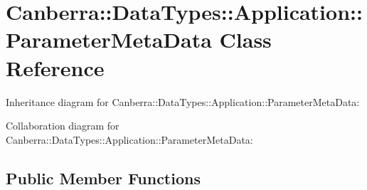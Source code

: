 \hypertarget{class_canberra_1_1_data_types_1_1_application_1_1_parameter_meta_data}{}\section{Canberra\+:\+:Data\+Types\+:\+:Application\+:\+:Parameter\+Meta\+Data Class Reference}
\label{class_canberra_1_1_data_types_1_1_application_1_1_parameter_meta_data}


Inheritance diagram for Canberra\+:\+:Data\+Types\+:\+:Application\+:\+:Parameter\+Meta\+Data\+:


Collaboration diagram for Canberra\+:\+:Data\+Types\+:\+:Application\+:\+:Parameter\+Meta\+Data\+:
\subsection*{Public Member Functions}

